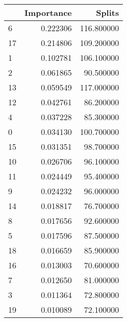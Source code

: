 \begin{tabular}{lrr}
\toprule
 & Importance & Splits \\
\midrule
6 & 0.222306 & 116.800000 \\
17 & 0.214806 & 109.200000 \\
1 & 0.102781 & 106.100000 \\
2 & 0.061865 & 90.500000 \\
13 & 0.059549 & 117.000000 \\
12 & 0.042761 & 86.200000 \\
4 & 0.037228 & 85.300000 \\
0 & 0.034130 & 100.700000 \\
15 & 0.031351 & 98.700000 \\
10 & 0.026706 & 96.100000 \\
11 & 0.024449 & 95.400000 \\
9 & 0.024232 & 96.000000 \\
14 & 0.018817 & 76.700000 \\
8 & 0.017656 & 92.600000 \\
5 & 0.017596 & 87.500000 \\
18 & 0.016659 & 85.900000 \\
16 & 0.013003 & 70.600000 \\
7 & 0.012650 & 81.000000 \\
3 & 0.011364 & 72.800000 \\
19 & 0.010089 & 72.100000 \\
\bottomrule
\end{tabular}